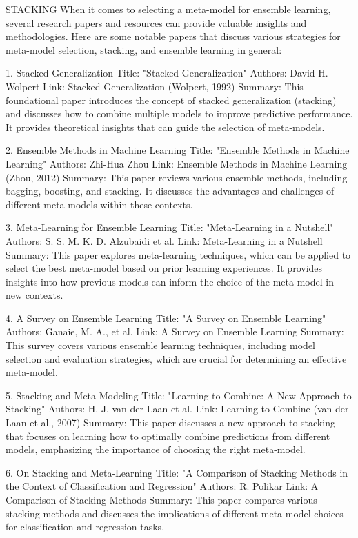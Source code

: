 STACKING
When it comes to selecting a meta-model for ensemble learning, several research papers and resources can provide valuable insights and methodologies. Here are some notable papers that discuss various strategies for meta-model selection, stacking, and ensemble learning in general:

1. Stacked Generalization
Title: "Stacked Generalization"
Authors: David H. Wolpert
Link: Stacked Generalization (Wolpert, 1992)
Summary: This foundational paper introduces the concept of stacked generalization (stacking) and discusses how to combine multiple models to improve predictive performance. It provides theoretical insights that can guide the selection of meta-models.


2. Ensemble Methods in Machine Learning
Title: "Ensemble Methods in Machine Learning"
Authors: Zhi-Hua Zhou
Link: Ensemble Methods in Machine Learning (Zhou, 2012)
Summary: This paper reviews various ensemble methods, including bagging, boosting, and stacking. It discusses the advantages and challenges of different meta-models within these contexts.


3. Meta-Learning for Ensemble Learning
Title: "Meta-Learning in a Nutshell"
Authors: S. S. M. K. D. Alzubaidi et al.
Link: Meta-Learning in a Nutshell
Summary: This paper explores meta-learning techniques, which can be applied to select the best meta-model based on prior learning experiences. It provides insights into how previous models can inform the choice of the meta-model in new contexts.


4. A Survey on Ensemble Learning
Title: "A Survey on Ensemble Learning"
Authors: Ganaie, M. A., et al.
Link: A Survey on Ensemble Learning
Summary: This survey covers various ensemble learning techniques, including model selection and evaluation strategies, which are crucial for determining an effective meta-model.


5. Stacking and Meta-Modeling
Title: "Learning to Combine: A New Approach to Stacking"
Authors: H. J. van der Laan et al.
Link: Learning to Combine (van der Laan et al., 2007)
Summary: This paper discusses a new approach to stacking that focuses on learning how to optimally combine predictions from different models, emphasizing the importance of choosing the right meta-model.


6. On Stacking and Meta-Learning
Title: "A Comparison of Stacking Methods in the Context of Classification and Regression"
Authors: R. Polikar
Link: A Comparison of Stacking Methods
Summary: This paper compares various stacking methods and discusses the implications of different meta-model choices for classification and regression tasks.


